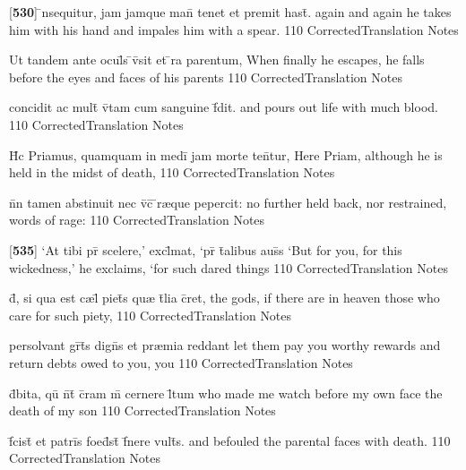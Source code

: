 \latline
  {[\textbf{530}] \={\macron {\i}}nsequitur, jam jamque man\={} tenet et premit hast\={}.}
  { again and again he takes him with his hand and impales him with a spear. }
  {110}
  { CorrectedTranslation }
  { Notes }


\latline
  {Ut tandem ante ocul\={}s \={}v\={}sit et \={}ra parentum,}
  { When finally he escapes, he falls before the eyes and faces of his parents }
  {110}
  { CorrectedTranslation }
  { Notes }


\latline
  {concidit ac mult\={} v\={\macron {\i}}tam cum sanguine f\={}dit.}
  { and pours out life with much blood. }
  {110}
  { CorrectedTranslation }
  { Notes }


\latline
  {H\={\macron {\i}}c Priamus, quamquam in medi\={} jam morte ten\={}tur,}
  { Here Priam, although he is held in the midst of death, }
  {110}
  { CorrectedTranslation }
  { Notes }


\latline
  {n\={}n tamen abstinuit nec v\={}c\={\macron {\i}} \={\macron {\i}}r{\ae}que pepercit:}
  { no further held back, nor restrained, words of rage: }
  {110}
  { CorrectedTranslation }
  { Notes }


\latline
  {[\textbf{535}] `At tibi pr\={} scelere,' excl\={}mat, `pr\={} \={\macron t{a}}libus aus\={\macron {\i}}s}
  { `But for you, for this wickedness,' he exclaims, `for such dared things }
  {110}
  { CorrectedTranslation }
  { Notes }


\latline
  {d\={\macron {\i}}, si qua est c{\ae}l\={} piet\={}s qu{\ae} t\={}lia c\={}ret,}
  { the gods, if there are in heaven those who care for such piety, }
  {110}
  { CorrectedTranslation }
  { Notes }


\latline
  {persolvant gr\={}t\={}s dign\={}s et pr{\ae}mia reddant}
  { let them pay you worthy rewards and return debts owed to you, you }
  {110}
  { CorrectedTranslation }
  { Notes }


\latline
  {d\={}bita, qu\={\macron {\i}} n\={}t\={\macron {\i}} c\={}ram m\={} cernere l\={}tum}
  { who made me watch before my own face the death of my son }
  {110}
  { CorrectedTranslation }
  { Notes }


\latline
  {f\={}cist\={\macron {\i}} et patri\={}s foed\={}st\={\macron {\i}} f\={}nere vult\={}s.}
  { and befouled the parental faces with death. }
  {110}
  { CorrectedTranslation }
  { Notes }


